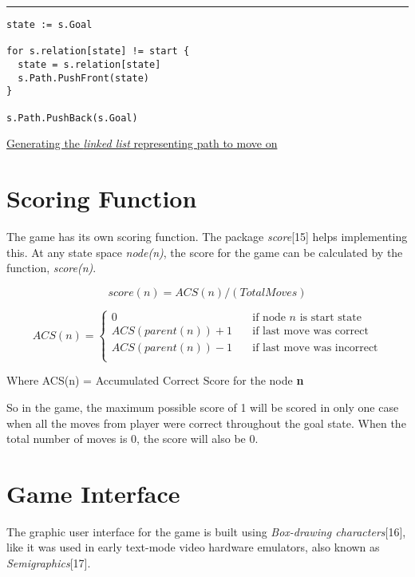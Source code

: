 \documentclass[a4paper]{article}
\begin{document}
\rule{\textwidth}{1pt}
\begin{verbatim}
state := s.Goal

for s.relation[state] != start {
  state = s.relation[state]
  s.Path.PushFront(state)
}

s.Path.PushBack(s.Goal)
\end{verbatim}
\underline{Generating the \textit{linked list} representing path to move on}

\section{Scoring Function}

\textrm{\normalsize{The game has its own scoring function. The package \textit{score}[15] helps implementing this. At any
state space \textit{node(n)}, the score for the game can be calculated by the function, \textit{score(n)}.\\}}

\begin{equation}
score(n) = ACS(n) / (Total Moves)
\end{equation}

\[ ACS(n) =
  \begin{cases}
    0       & \quad \text{if } \text{node } n \text{ is start state}\\
    ACS(parent(n)) + 1  & \quad \text{if } \text{last move was correct}\\
    ACS(parent(n)) - 1  & \quad \text{if } \text{last move was incorrect}\\
  \end{cases}
\]

\begin{center}
Where ACS(n) = Accumulated Correct Score for the node \textbf{n}
\end{center}

\textrm{\normalsize{So in the game, the maximum possible score of 1 will be scored in only one case when all the
moves from player were correct throughout the goal state. When the total number of moves is 0,
the score will also be 0.\\}}

\section{Game Interface}

\textrm{\normalsize{The graphic user interface for the game is built using \textit{Box-drawing characters}[16], like it was used in
early text-mode video hardware emulators, also known as \textit{Semigraphics}[17].\\}}
\end{document}
